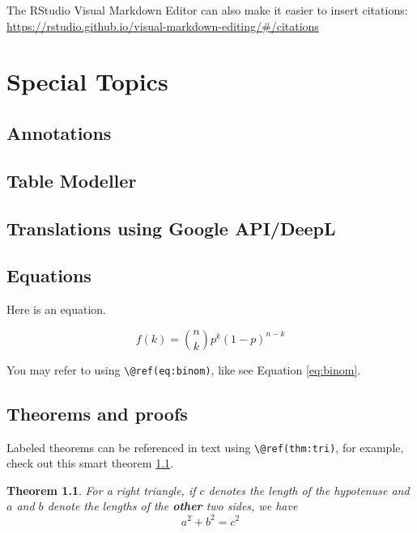 \documentclass[
]{book}
\newtheorem{theorem}{Theorem}[chapter]
\theoremstyle{definition}
\theoremstyle{definition}
\theoremstyle{definition}
\theoremstyle{definition}
\theoremstyle{remark}
\begin{document}
The RStudio Visual Markdown Editor can also make it easier to insert citations: \url{https://rstudio.github.io/visual-markdown-editing/\#/citations}

\hypertarget{special-topics}{%
\chapter{Special Topics}\label{special-topics}}

\hypertarget{annotations}{%
\section{Annotations}\label{annotations}}

\hypertarget{table-modeller}{%
\section{Table Modeller}\label{table-modeller}}

\hypertarget{translations-using-google-apideepl}{%
\section{Translations using Google API/DeepL}\label{translations-using-google-apideepl}}

\hypertarget{equations}{%
\section{Equations}\label{equations}}

Here is an equation.

\begin{equation} 
  f\left(k\right) = \binom{n}{k} p^k\left(1-p\right)^{n-k}
  \label{eq:binom}
\end{equation}

You may refer to using \texttt{\textbackslash{}@ref(eq:binom)}, like see Equation \eqref{eq:binom}.

\hypertarget{theorems-and-proofs}{%
\section{Theorems and proofs}\label{theorems-and-proofs}}

Labeled theorems can be referenced in text using \texttt{\textbackslash{}@ref(thm:tri)}, for example, check out this smart theorem \ref{thm:tri}.

\begin{theorem}
\protect\hypertarget{thm:tri}{}\label{thm:tri}For a right triangle, if \(c\) denotes the \emph{length} of the hypotenuse
and \(a\) and \(b\) denote the lengths of the \textbf{other} two sides, we have
\[a^2 + b^2 = c^2\]
\end{theorem}
\end{document}
